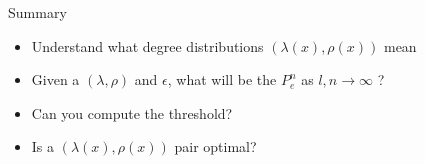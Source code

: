 
\begin{frame}{Summary}
\begin{itemize}
  \item Understand what degree distributions $(\lambda(x),\rho(x))$ mean
\pause
  \item Given a $(\lambda,\rho)$ and $\epsilon$, what will be the $P_e^n$ as $l,n \rightarrow \infty$ ?
\pause
  \item Can you compute the threshold?
\pause
  \item Is a $(\lambda(x),\rho(x))$ pair optimal?
\end{itemize}
\end{frame} 